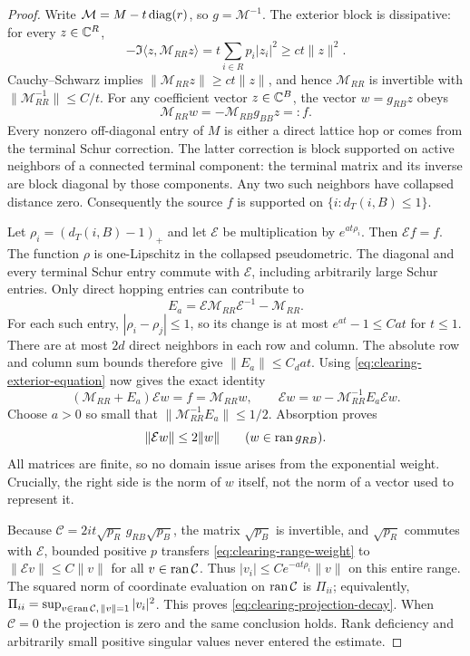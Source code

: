 \begin{proof}
Write $\mathcal M=M-t\operatorname{diag}(r)$, so $g=\mathcal M^{-1}$.  The exterior block is dissipative:
for every $z\in\mathbb C^R$,
\[
 -\Im\langle z,\mathcal M_{RR}z\rangle
       =t\sum_{i\in R}p_i|z_i|^2\ge ct\|z\|^2.
\]
Cauchy--Schwarz implies $\|\mathcal M_{RR}z\|\ge ct\|z\|$, and hence
$\mathcal M_{RR}$ is invertible with $\|\mathcal M_{RR}^{-1}\|\le C/t$.
For any coefficient vector $z\in\mathbb C^B$, the vector $w=g_{RB}z$ obeys
\begin{equation}\label{eq:clearing-exterior-equation}
 \mathcal M_{RR}w=-\mathcal M_{RB}g_{BB}z=:f.
\end{equation}
Every nonzero off-diagonal entry of $M$ is either a direct lattice hop or
comes from the terminal Schur correction.  The latter correction is block
supported on active neighbors of a connected terminal component: the
terminal matrix and its inverse are block diagonal by those components.
Any two such neighbors have collapsed distance zero.  Consequently the
source $f$ is supported on $\{i:d_T(i,B)\le1\}$.

Let $\rho_i=(d_T(i,B)-1)_+$ and let $\mathcal E$ be multiplication by
$e^{at\rho_i}$.  Then $\mathcal E f=f$.  The function $\rho$ is one-Lipschitz
in the collapsed pseudometric.  The diagonal and every terminal Schur
entry commute with $\mathcal E$, including arbitrarily large Schur entries.
Only direct hopping entries can contribute to
\[
 E_a=\mathcal E \mathcal M_{RR}\mathcal E^{-1}-\mathcal M_{RR}.
\]
For each such entry, $|\rho_i-\rho_j|\le1$, so its change is at most
$e^{at}-1\le C at$ for $t\le1$.  There are at most $2d$ direct neighbors
in each row and column.  The absolute row and column sum bounds therefore
give $\|E_a\|\le C_d at$.
Using \eqref{eq:clearing-exterior-equation} now gives the exact identity
\[
 (\mathcal M_{RR}+E_a)\mathcal Ew=f=\mathcal M_{RR}w,
 \qquad
 \mathcal Ew=w-\mathcal M_{RR}^{-1}E_a\mathcal Ew.
\]
Choose $a>0$ so small that $\|\mathcal M_{RR}^{-1}E_a\|\le1/2$.
Absorption proves
\begin{equation}\label{eq:clearing-range-weight}
 \|\mathcal Ew\|\le2\|w\|\qquad(w\in\operatorname{ran} g_{RB}).
\end{equation}
All matrices are finite, so no domain issue arises from the exponential
weight.  Crucially, the right side is the norm of $w$ itself, not the norm
of a vector used to represent it.

Because
$\mathcal C=2it\sqrt{p_R}\,g_{RB}\sqrt{p_B}$, the matrix $\sqrt{p_B}$ is
invertible, and $\sqrt{p_R}$ commutes with $\mathcal E$, bounded positive
$p$ transfers \eqref{eq:clearing-range-weight} to
$\|\mathcal Ev\|\le C\|v\|$ for all $v\in\operatorname{ran} \mathcal C$.
Thus $|v_i|\le C e^{-at\rho_i}\|v\|$ on this entire range.
The squared norm of coordinate evaluation on $\operatorname{ran} \mathcal C$ is $\Pi_{ii}$;
equivalently,
$\Pi_{ii}=\sup_{v\in\operatorname{ran} \mathcal C,\,\|v\|=1}|v_i|^2$.
This proves \eqref{eq:clearing-projection-decay}.  When $\mathcal C=0$ the projection
is zero and the same conclusion holds.  Rank deficiency and arbitrarily
small positive singular values never entered the estimate.
\end{proof}


